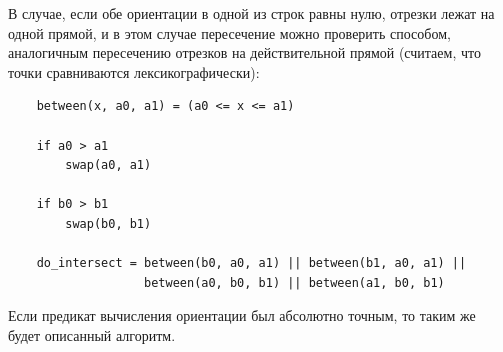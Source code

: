 В случае, если обе ориентации в одной из строк равны нулю, отрезки лежат на одной прямой, и в этом случае пересечение можно проверить способом, аналогичным пересечению отрезков на действительной прямой (считаем, что точки сравниваются лексикографически):

\begin{verbatim}
	between(x, a0, a1) = (a0 <= x <= a1)
	
	if a0 > a1
	    swap(a0, a1)
	
	if b0 > b1
	    swap(b0, b1)
	
	do_intersect = between(b0, a0, a1) || between(b1, a0, a1) ||
	               between(a0, b0, b1) || between(a1, b0, b1)
\end{verbatim}

Если предикат вычисления ориентации был абсолютно точным, то таким же будет описанный алгоритм.


